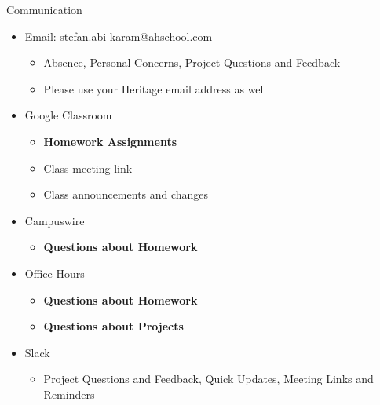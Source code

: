 \documentclass[]{beamer}
\begin{document}
\begin{frame}{Communication}

    \begin{itemize}
        \item Email: \href{mailto:stefan.abi-karam@ahschool.com}{stefan.abi-karam@ahschool.com}
        \begin{itemize}
            \item Absence, Personal Concerns, Project Questions and Feedback
            \item Please use your Heritage email address as well
        \end{itemize}

        \item Google Classroom
        \begin{itemize}
            \item \textbf{Homework Assignments}
            \item Class meeting link
            \item Class announcements and changes
        \end{itemize}

        \item Campuswire
        \begin{itemize}
            \item \textbf{Questions about Homework}
        \end{itemize}

        \item Office Hours
        \begin{itemize}
            \item \textbf{Questions about Homework}
            \item \textbf{Questions about Projects}
        \end{itemize}
        
        \item Slack
        \begin{itemize}
            \item Project Questions and Feedback, Quick Updates, Meeting Links and Reminders
        \end{itemize}
    \end{itemize}

\end{frame}
\end{document}
